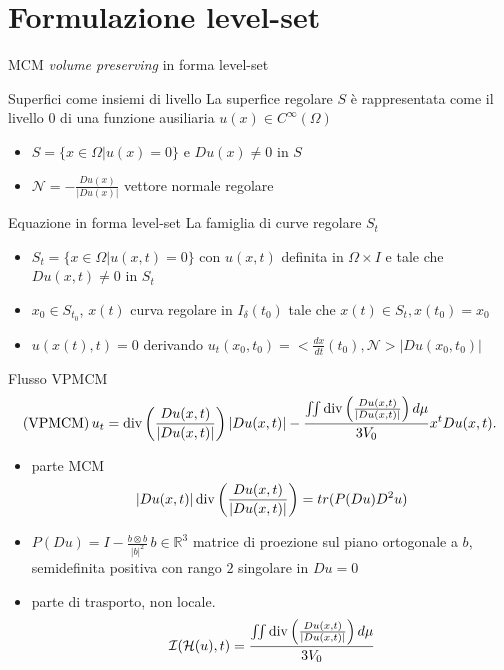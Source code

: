 \section{Formulazione level-set}
\begin{frame}{MCM \emph{volume preserving} in forma level-set}
  \begin{block}{Superfici come insiemi di livello}
    La superfice regolare $S$ è rappresentata come il livello $0$ di
    una funzione ausiliaria $u(x)\in C^{\infty}(\Omega)$
    \begin{itemize}
      \item $S=\{x\in\Omega | u(x)=0\}$ e $Du(x)\neq 0$ in $S$
      \item $\mathcal{N}=-\frac{Du(x)}{|Du(x)|}$ vettore normale
        regolare
    \end{itemize}
  \end{block}
  \begin{block}{Equazione in forma level-set}
    La famiglia di curve regolare $S_t$
    \begin{itemize}
      \item $S_t=\{x\in\Omega | u(x,t)=0\}$ con $u(x,t)$ definita in
        $\Omega\times I$ e tale che $Du(x,t)\neq 0$ in $S_t$
      \item $x_0\in S_{t_0}$, $x(t)$ curva regolare in
        $I_{\delta}(t_0)$ tale che $x(t)\in S_t,x(t_0)=x_0$
      \item $u(x(t),t)=0$ derivando $u_t(x_0,t_0)=<\frac{dx}{dt}(t_0),\mathcal{N}>|Du(x_0,t_0)|$
    \end{itemize}
  \end{block}
\end{frame}

\begin{frame}{Flusso VPMCM}
    \[
      (\text{VPMCM})\,u_t=\operatorname{div}\left(\frac{Du(x,t)}{|Du(x,t)|}\right)|Du(x,t)|-\frac{\iint\operatorname{div}\left(\frac{Du(x,t)}{|Du(x,t)|}\right)d\mu}{3V_0}x^tDu(x,t). 
      \]
    \begin{itemize}
    \item parte MCM 
      \[
      |Du(x,t)|\operatorname{div}\left(\frac{Du(x,t)}{|Du(x,t)|}\right)=tr(P(Du)D^2u)
      \]
      \item $P(Du)=I-\frac{b\otimes b}{|b|^2}\,b\in\mathbb{R}^3$
        matrice di proezione sul piano ortogonale a $b$, semidefinita
        positiva con rango $2$ singolare in $Du=0$
      \item parte di trasporto, non locale. 
        \[
        \mathcal{I}(\mathcal{H}(u),t)=\frac{\iint\operatorname{div}\left(\frac{Du(x,t)}{|Du(x,t)|}\right)d\mu}{3V_0}
        \]
     \end{itemize}
\end{frame}


